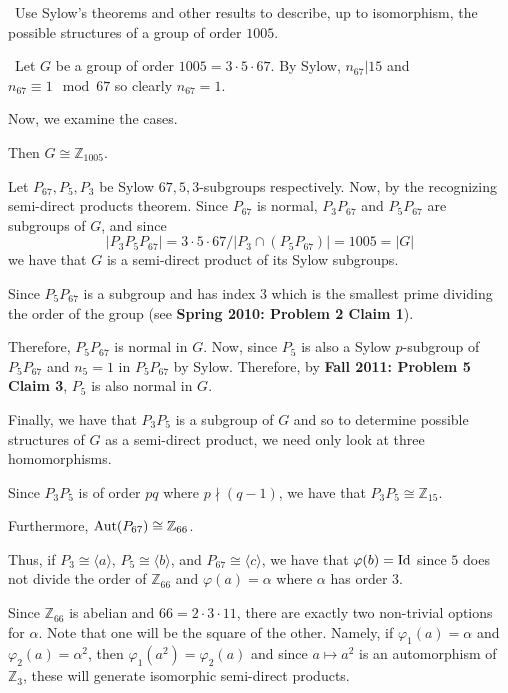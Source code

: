 \documentclass[12pt]{Qual}
\begin{document}
\begin{problem} $\,$
Use Sylow's theorems and other results to describe, up to isomorphism, the possible structures of a group of order $1005$.
\end{problem}


\begin{solution}$\,$
Let $G$ be a group of order $1005=3\cdot5\cdot 67.$ By Sylow, $n_{67}|15$ and $n_{67}\equiv 1\mod67$ so clearly $n_{67}=1$.

Now, we examine the cases.

 Then $G\cong\mathbb{Z}_{1005}.$

Let $P_{67},P_5,P_3$ be Sylow $67,5,3$-subgroups respectively. Now, by the recognizing semi-direct products theorem. Since $P_{67}$ is normal, $P_3P_{67}$ and $P_5P_{67}$ are subgroups of $G$, and since $$|P_3P_5P_{67}|=3\cdot5\cdot67/|P_3\cap(P_5P_{67})|=1005=|G|$$ we have that $G$ is a semi-direct product of its Sylow subgroups.

Since $P_5P_{67}$ is a subgroup and has index $3$ which is the smallest prime dividing the order of the group (see \textbf{Spring 2010: Problem 2 Claim 1}).

Therefore, $P_5P_{67}$ is normal in $G$. Now, since $P_5$ is also a Sylow $p$-subgroup of $P_5P_{67}$ and $n_5=1$ in $P_5P_{67}$ by Sylow. Therefore, by \textbf{Fall 2011: Problem 5 Claim 3}, $P_5$ is also normal in $G$.

Finally, we have that $P_3P_5$ is a subgroup of $G$ and so to determine possible structures of $G$ as a semi-direct product, we need only look at three homomorphisms.

 Since $P_3P_5$ is of order $pq$ where $p\nmid(q-1)$, we have that $P_3P_5\cong\mathbb{Z}_{15}.$

Furthermore, $\text{Aut}(P_{67})\cong\mathbb{Z}_{66}$.

Thus, if $P_3\cong\langle a\rangle$, $P_5\cong\langle b\rangle$, and $P_{67}\cong\langle c\rangle$, we have that $\varphi(b)=\text{Id}$ since $5$ does not divide the order of $\mathbb{Z}_{66}$ and $\varphi(a)=\alpha$ where $\alpha$ has order $3.$

Since $\mathbb{Z}_{66}$ is abelian and $66=2\cdot3\cdot 11$, there are exactly two non-trivial options for $\alpha$. Note that one will be the square of the other. Namely, if $\varphi_1(a)=\alpha$ and $\varphi_2(a)=\alpha^2$, then $\varphi_1(a^2)=\varphi_2(a)$ and since $a\mapsto a^2$ is an automorphism of $\mathbb{Z}_3$, these will generate isomorphic semi-direct products.


\end{solution}
\end{document}
